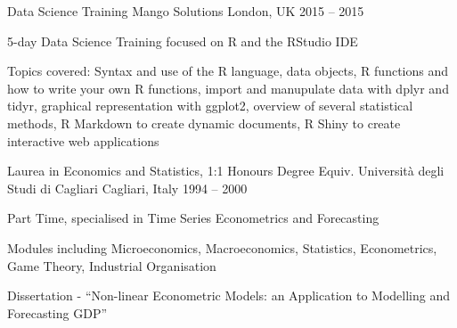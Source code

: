 \begin{cventries}
  \cventry
    {Data Science Training} %
    {Mango Solutions} %
    {London, UK} %
    {2015 – 2015} %
    {
      \begin{cvitems} %
        \item {5-day Data Science Training focused on R and the RStudio IDE}
        \item {Topics covered: Syntax and use of the R language, data objects, R functions and how to write your own R functions, import and manupulate data with dplyr and tidyr, graphical representation with ggplot2, overview of several statistical methods, R Markdown to create dynamic documents, R Shiny to create interactive web applications}
      \end{cvitems}
    }
  \cventry
    {Laurea in Economics and Statistics, 1:1 Honours Degree Equiv.} %
    {Università degli Studi di Cagliari} %
    {Cagliari, Italy} %
    {1994 – 2000} %
    {
      \begin{cvitems} %
        \item {Part Time, specialised in Time Series Econometrics and Forecasting}
        \item {Modules including Microeconomics, Macroeconomics, Statistics, Econometrics, Game Theory, Industrial Organisation}
        \item {Dissertation - “Non-linear Econometric Models: an Application to Modelling and Forecasting GDP”}
      \end{cvitems}
    }
\end{cventries}
